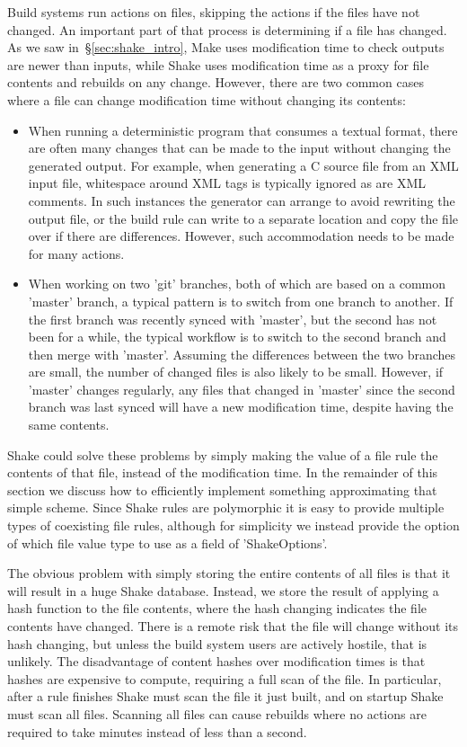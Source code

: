 Build systems run actions on files, skipping the actions if the files have not
changed. An important part of that process is determining if a file has
changed. As we saw in~\S\ref{sec:shake_intro}, Make uses modification time to
check outputs are newer than inputs, while Shake uses modification time as a
proxy for file contents and rebuilds on any change. However, there are two
common cases where a file can change modification time without changing its
contents:

\begin{itemize}
\item When running a deterministic program that consumes a textual format, there
are often many changes that can be made to the input without changing the
generated output. For example, when generating a C source file from an XML input
file, whitespace around XML tags is typically ignored as are XML comments. In
such instances the generator can arrange to avoid rewriting the output file, or
the build rule can write to a separate location and copy the file over if there
are differences. However, such accommodation needs to be made for many actions.
\item When working on two \lst'git' branches, both of which are based on a
common \lst'master' branch, a typical pattern is to switch from one branch to
another. If the first branch was recently synced with \lst'master', but the
second has not been for a while, the typical workflow is to switch to the second
branch and then merge with \lst'master'. Assuming the differences between the
two branches are small, the number of changed files is also likely to be small.
However, if \lst'master' changes regularly, any files that changed in
\lst'master' since the second branch was last synced will have a new
modification time, despite having the same contents.
\end{itemize}

Shake could solve these problems by simply making the value of a file rule the
contents of that file, instead of the modification time. In the remainder of
this section we discuss how to efficiently implement something approximating
that simple scheme. Since Shake rules are polymorphic it is easy to provide
multiple types of coexisting file rules, although for simplicity we instead
provide the option of which file value type to use as a field of
\lst'ShakeOptions'.

The obvious problem with simply storing the entire contents of all files is that
it will result in a huge Shake database. Instead, we store the result of
applying a hash function to the file contents, where the hash changing indicates
the file contents have changed. There is a remote risk that the file will
change without its hash changing, but unless the build system users are actively
hostile, that is unlikely. The disadvantage of content hashes over modification
times is that hashes are expensive to compute, requiring a full scan of the
file. In particular, after a rule finishes Shake must scan the file it just
built, and on startup Shake must scan all files. Scanning all files can cause
rebuilds where no actions are required to take minutes instead of less than a
second.

